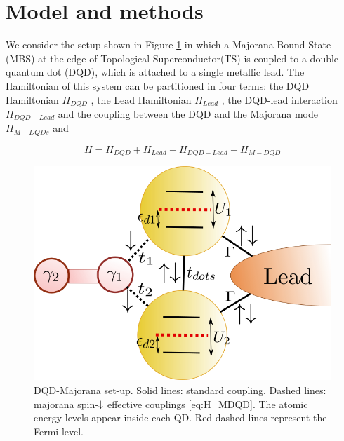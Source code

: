 \documentclass[showpacs,aps,prb,reprint,superscriptaddress]{revtex4-1}
\newcommand{\LUIS}[1]{\textcolor{blue}{\fbox{Luis} {\sl#1}}}
\begin{document}
\section{Model and methods}
\label{sec:modelmethods}





We consider the setup shown in Figure \ref{fig:GenModel} in which a Majorana Bound State (MBS) at the edge of Topological Superconductor(TS) is coupled to a double quantum dot (DQD), which is attached to a single metallic lead. The Hamiltonian of this system can be partitioned in four terms: the DQD Hamiltonian $H_{DQD}$ , the Lead Hamiltonian $H_{Lead}$ , the DQD-lead interaction  $H_{DQD-Lead}$ and the coupling between the DQD and the Majorana mode $H_{M-DQDs}$ and   

\begin{equation}
H=H_{DQD}+H_{Lead}+H_{DQD-Lead}+H_{M-DQD} 
\label{eq:Model}
\end{equation}


\begin{figure}[bt]
\begin{center}
\includegraphics[scale=0.4]{Graficos/Model.png}
\caption{ DQD-Majorana set-up. Solid lines: standard coupling. Dashed lines: majorana spin-$\downarrow$ effective couplings \eqref{eq:H_MDQD}. The atomic energy levels appear inside each QD. Red dashed lines represent the Fermi level.  
}
%
\label{fig:GenModel}
\end{center}
\end{figure}
\end{document}
